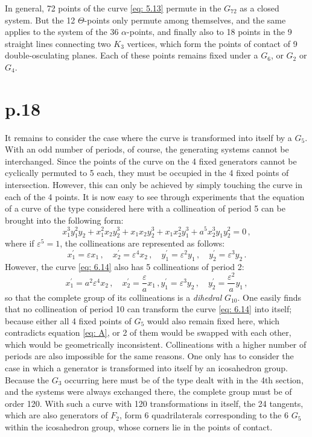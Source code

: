 \documentclass[leqno]{article}
\begin{document}
In general, 72 points of the curve \eqref{eq: 5.13} permute in the $G_{72}$ as a closed system. But the 12 $\Theta$-points only permute among themselves, and the same applies to the system of the 36 $\alpha$-points, and finally also to 18 points in the 9 straight lines connecting two $K_3$ vertices, which form the points of contact of 9 double-osculating planes. Each of these points remains fixed under a $G_6$, or $G_2$ or $G_4$. 
\section{p.18}
It remains to consider the case where the curve is transformed into itself by a $G_5$. With an odd number of periods, of course, the generating systems cannot be interchanged. Since the points of the curve on the 4 fixed generators cannot be cyclically permuted to 5 each, they must be occupied in the 4 fixed points of intersection. However, this can only be achieved by simply touching the curve in each of the 4 points. It is now easy to see through experiments that the equation of a curve of the type considered here with a collineation of period 5 can be brought into the following form: 
\begin{equation}\label{eq: 6.14}
x_1^3 y_1^2 y_2 + x_1^2 x_2 y_2^3 + x_1 x_2 y_2^3 + x_1 x_2^2 y_1^3 + a^5 x_2^3 y_1 y_2^2 = 0 \, , \tag{14}
\end{equation}
where if $\varepsilon^5=1 $, the collineations are represented as follows:
\[
x_1^\prime = \varepsilon x_1 \, , \quad x_2^\prime = \varepsilon^4 x_2 \, , \quad y_1^\prime = \varepsilon^2 y_1 \, , \quad y_2^\prime = \varepsilon^3 y_2 \, . 
\]
However, the curve \eqref{eq: 6.14} also has 5 collineations of period 2: 
\[
x_1^\prime = a^2 \varepsilon^4 x_2 \, , \quad x_2^\prime = \frac{\varepsilon}{a} x_1 \, , y_1^\prime = \varepsilon^3 y_2 \, , \quad y_2^\prime = \frac{\varepsilon^2}{a} y_1 \, , 
\]
so that the complete group of its collineations is a \textit{dihedral} $G_{10}$. One easily finds that no collineation of period 10 can transform the curve \eqref{eq: 6.14} into itself; because either all 4 fixed points of $G_5$ would also remain fixed here, which contradicts equation \eqref{eq: A}, or 2 of them would be swapped with each other, which would be geometrically inconsistent. Collineations with a higher number of periods are also impossible for the same reasons. One only has to consider the case in which a generator is transformed into itself by an icosahedron group. Because the $G_3$ occurring here must be of the type dealt with in the 4th section, and the systems were always exchanged there, the complete group must be of order 120. With such a curve with 120 transformations in itself, the 24 tangents, which are also generators of $F_2$, form 6 quadrilaterals corresponding to the 6 $G_5$ within the icosahedron group, whose corners lie in the points of contact. \\
\end{document}
